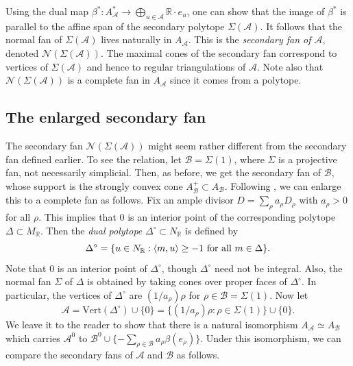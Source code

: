 \documentclass{amsart}
\theoremstyle{plain}
\theoremstyle{definition}
\begin{document}
	Using the dual map $\beta^* : A_{\mathcal{A}}^* \to \bigoplus_{u
\in \mathcal{A}} \mathbb{R}\cdot e_u$, one can show that the image of
$\beta^*$ is parallel to the affine span of the secondary polytope
$\Sigma(\mathcal{A})$.  It follows that the normal fan of
$\Sigma(\mathcal{A})$ lives naturally in $A_{\mathcal{A}}$.  This is the {\it
secondary fan of $\mathcal{A}$\/}, denoted $\mathcal{N}(\Sigma(\mathcal{A}))$.
The maximal cones of the secondary fan correspond to vertices of
$\Sigma(\mathcal{A})$ and hence to regular triangulations of $\mathcal{A}$.
Note also that $\mathcal{N}(\Sigma(\mathcal{A}))$ is a complete fan in
$A_{\mathcal{A}}$ since it comes from a polytope.

	\subsection{The enlarged secondary fan} The secondary
fan $\mathcal{N}(\Sigma(\mathcal{A}))$ might seem rather different from the
secondary fan defined earlier.  To see the relation, let $\mathcal{B} =
\Sigma(1)$, where $\Sigma$ is a projective fan, not necessarily
simplicial.  Then, as before, we get the secondary fan of $\mathcal{B}$,
whose support is the strongly convex cone $A^+_{\mathcal{B}} \subset
A_{\mathcal{B}}$.  Following \cite{AGM2}, we can enlarge this to a
complete fan as follows.  Fix an ample divisor $D = \sum_\rho a_\rho
D_\rho$ with $a_\rho > 0$ for all $\rho$.  This implies that $0$ is an
interior point of the corresponding polytope $\Delta \subset M_\mathbb{R}$.  Then the {\it dual polytope\/} $\Delta^\circ \subset N_\mathbb{R}$
is defined by
\[
\Delta^\circ = \{u \in N_\mathbb{R} : \langle m,u\rangle \ge -1\ \hbox{for
all}\ m \in \Delta\}.
\]
Note that $0$ is an interior point of $\Delta^\circ$, though
$\Delta^\circ$ need not be integral.  Also, the normal fan $\Sigma$ of
$\Delta$ is obtained by taking cones over proper faces of
$\Delta^\circ$.  In particular, the vertices of $\Delta^\circ$ are
$(1/a_\rho)\rho$ for $\rho
\in \mathcal{B} = \Sigma(1)$.  Now let 
\[
\mathcal{A} = \mathrm{Vert}(\Delta^\circ)\cup\{0\} = \{(1/a_\rho)\rho :
\rho \in \Sigma(1)\} \cup\{0\}.
\]
We leave it to the reader to show that there is a natural isomorphism
$A_{\mathcal{A}} \simeq A_{\mathcal{B}}$ which carries $\mathcal{A}^0$ to
$\mathcal{B}^0\cup\{-\sum_{\rho\in\mathcal{B}} a_\rho \beta(e_\rho)\}$.  Under
this isomorphism, we can compare the secondary fans of $\mathcal{A}$ and
$\mathcal{B}$ as follows.
\end{document}
